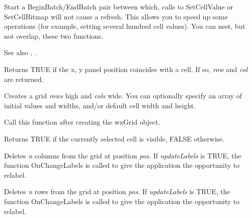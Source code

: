 Start a BeginBatch/EndBatch pair between which, calls to SetCellValue or
SetCellBitmap will not cause a refresh. This allows you to speed up some operations
(for example, setting several hundred cell values). You can nest, but not overlap,
these two functions.

See also , .



Returns TRUE if the x, y panel position coincides with a cell. If so, {\it row} and {\it col} are
returned.



Creates a grid {\it rows} high and {\it cols} wide. You can optionally specify an array of initial values
and widths, and/or default cell width and height.

Call this function after creating the wxGrid object.



Returns TRUE if the currently selected cell is visible, FALSE otherwise.



Deletes {\it n} columns from the grid at position {\it pos}. If {\it updateLabels} is TRUE,
the function OnChangeLabels is called to give the application the opportunity to relabel.



Deletes {\it n} rows from the grid at position {\it pos}. If {\it updateLabels} is TRUE,
the function OnChangeLabels is called to give the application the opportunity to relabel.

